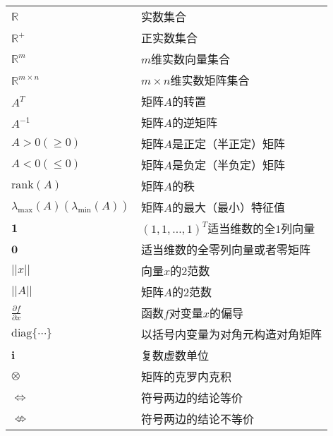 

\begin{fuhao}
\begin{tabular}{p{5cm} p{10cm}}
$\mathbb{R}$                                                           &             实数集合\\
$\mathbb{R}^+$                                                        &            正实数集合\\
$\mathbb{R}^m$                                                      &            $m$维实数向量集合\\
$\mathbb{R}^{m\times n}$                                       &   $m\times n$维实数矩阵集合\\
$A^T$                                                                     &     矩阵$A$的转置\\
$A^{-1}$                                                                 &       矩阵$A$的逆矩阵\\
$A>0(\geq 0)$                                                          &       矩阵$A$是正定（半正定）矩阵\\
$A<0(\leq 0)$                                                           &       矩阵$A$是负定（半负定）矩阵\\
$\text{rank}(A)$                                                      &       矩阵$A$的秩\\
$\lambda_{\max}(A)(\lambda_{\min}(A))$               &       矩阵$A$的最大（最小）特征值\\
$\textbf{1}$                                                             &       $(1,1,\ldots,1)^T$适当维数的全$1$列向量\\
$\textbf{0}$                                                             &       适当维数的全零列向量或者零矩阵\\
$||x||$                                                                       &       向量$x$的$2$范数\\
$||A||$                                                                      &        矩阵$A$的$2$范数\\
$\frac{\partial f}{\partial x}$                                     &        函数$f$对变量$x$的偏导\\
$\text{diag}\{\cdots\}$                                              &        以括号内变量为对角元构造对角矩阵\\
$\textbf{i}$                                                              &       复数虚数单位\\
$\otimes$                                                                 &       矩阵的克罗内克积\\
$\Leftrightarrow$                                                     &       符号两边的结论等价\\
$\nLeftrightarrow$                                                   &        符号两边的结论不等价
\end{tabular}
\end{fuhao}
